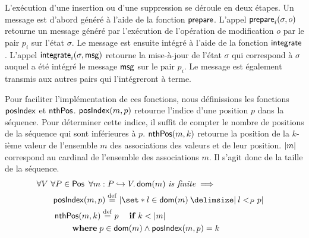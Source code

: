 L'exécution d'une insertion ou d'une suppression se déroule en deux étapes.
Un message est d'abord généré à l'aide de la fonction $\trm{prepare}$.
L'appel $\trm{prepare}_i(\sigma, o)$ retourne un message généré par l'exécution de l'opération de modification $o$ par le pair $p_i$ sur l'état $\sigma$.
Le message est ensuite intégré à l'aide de la fonction $\trm{integrate}$.
L'appel $\trm{integrate}_i(\sigma, \trm{msg})$ retourne la mise-à-jour de l'état $\sigma$ qui correspond à $\sigma$ auquel a été intégré le message $\trm{msg}$ sur le pair $p_i$.
Le message est également transmis aux autres pairs qui l'intégreront à terme.

Pour faciliter l'implémentation de ces fonctions, nous définissions les fonctions $\trm{posIndex}$ et $\trm{nthPos}$.
$\trm{posIndex}(m,p)$ retourne l'indice d'une position $p$ dans la séquence.
Pour déterminer cette indice, il suffit de compter le nombre de positions de la séquence qui sont inférieures à $p$.
$\trm{nthPos}(m,k)$ retourne la position de la $k$-ième valeur de l'ensemble $m$ des associations des valeurs et de leur position.
$\card*{m}$ correspond au cardinal de l'ensemble des associations $m$.
Il s'agit donc de la taille de la séquence.
%
\begin{equation}\begin{split}
\MoveEqLeft \forall V \ \forall P \in \trm{Pos} \ \forall m: P \pto V \qsep \trm{dom}(m)\ \textit{is finite} \implies\\
%
&\begin{aligned}
\trm{posIndex}&(m, p) \defeq%
\card*{\set*{l \in \trm{dom}(m) \given l <_P p}}
\end{aligned}\\
%
&\begin{aligned}
\MoveEqLeft \trm{nthPos}(m, k) \defeq p \quad\when k < \card*{m}\\
&\where p \in \trm{dom}(m) \land \trm{posIndex}(m, p) = k
\end{aligned}
%
\end{split}\end{equation}

